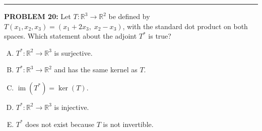 \documentclass[12pt]{amsart}
\newcommand{\divider}{
  \vspace{-1em} %
  \noindent
  \raisebox{-0.15ex}{\textbullet}%
  \hspace{0.5em}%
  \rule[0.5ex]{0.95\textwidth}{1.0pt}%
  \hspace{0.5em}%
  \raisebox{-0.15ex}{\textbullet}%
  \vspace{0em} %
}
\begin{document}
\divider


\newpage



{\bf PROBLEM 20:}
%
Let $T: \mathbb{R}^3 \to \mathbb{R}^2$ be defined by $T(x_1, x_2, x_3) = (x_1 + 2x_3,\; x_2 - x_3)$, with the standard dot product on both spaces. Which statement about the adjoint $T^*$ is true?

\begin{enumerate}[(A)]
\item $T^*: \mathbb{R}^2 \to \mathbb{R}^3$ is surjective.
\item $T^*: \mathbb{R}^3 \to \mathbb{R}^2$ and has the same kernel as $T$.
\item $\operatorname{im}(T^*) = \ker(T)$.
\item $T^*: \mathbb{R}^2 \to \mathbb{R}^3$ is injective.
\item $T^*$ does not exist because $T$ is not invertible.
\end{enumerate}
\end{document}
